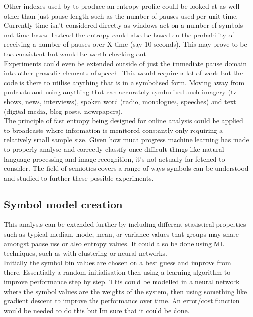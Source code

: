 Other indexes used by to produce an entropy profile could be looked at as well other than just pause length such as the number of pauses used per unit time. Currently time isn't considered directly as windows act on a number of symbols not time bases. Instead the entropy could also be based on the probability of receiving a number of pauses over X time (say 10 seconds). This may prove to be too consistent but would be worth checking out. \\

Experiments could even be extended outside of just the immediate pause domain into other prosodic elements of speech. This would require a lot of work but the code is there to utilise anything that is in a symbolised form. Moving away from podcasts and using anything that can accurately symbolised such imagery (tv shows, news, interviews), spoken word (radio, monologues, speeches) and text (digital media, blog posts, newspapers).  \\

The principle of fast entropy being designed for online analysis could be applied  to broadcasts where information is monitored constantly only requiring a relatively small sample size. Given how much progress machine learning has made to properly analyse and correctly classify once difficult things like natural language processing and image recognition, it's not actually far fetched to consider. The field of semiotics covers a range of ways symbols can be understood and studied to further these possible experiments. \\

\subsection{Symbol model creation}
This analysis can be extended further by including different statistical properties such as typical median, mode, mean, or variance values that groups may share amongst pause use or also entropy values. It could also be done using ML techniques, such as with clustering or neural networks. \\

Initially the symbol bin values are chosen on a best guess and improve from there. Essentially a random initialisation then using a learning algorithm to improve performance step by step. This could be modelled in a neural network where the symbol values are the weights of the system, then using something like gradient descent to improve the performance over time. An error/cost function would be needed to do this but Im sure that it could be done. \\


